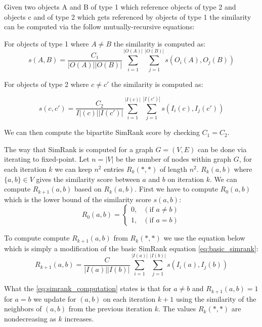 \begin{definition}\label{def:bipartite_simrank} Given two objects A and B of type 1 which reference objects of type 2 and objects c and of type 2 which gets referenced by objects of type 1 the similarity can be computed via the follow mutually-recursive equations:
	
	For objects of type 1 where $A \neq B$ the similarity is computed as:
	\begin{equation}\label{eq:bipartite_simrank1}
	s(A,B)= \frac{C_1}{|O(A)||O(B)|}\sum^{|O(A)|}_{i=1}\sum^{|O(B)|}_{j=1}s(O_i(A),O_j(B))
	\end{equation}
	
	For objects of type 2 where $c \neq c'$ the similarity is computed as:

	\begin{equation}\label{eq:bipartite_simrank2}
	s(c,c')= \frac{C_2}{I|(c)||I(c')|}\sum^{|I(c)|}_{i=1}\sum^{|I(c')|}_{j=1}s(I_i(c),I_j(c'))
	\end{equation}
	
	We can then compute the bipartite SimRank score by checking $C_1 = C_2$\cite{10.1145/775047.775126}.
\end{definition}

The way that SimRank is computed for a graph $G = (V,E)$ can be done via iterating to fixed-point. Let $n = |V|$ be the number of nodes within graph $G$, for each iteration $k$ we can keep $n^2$ entries $R_k(*,*)$ of length $n^2$. $R_k(a,b)$ where $\{a,b\} \in V$ gives the similarity score between $a$ and $b$ on iteration $k$\cite{10.1145/775047.775126}. We can compute $R_{k+1}(a,b)$ based on $R_k(a,b)$. First we have to compute $R_0(a,b)$ which is the lower bound of the similarity score $s(a,b)$:
\begin{equation}\label{eq:lowerbound_sim_score}
R_0(a,b)= \begin{cases}
0, & (\text{if } a \neq b) \\

1 ,& (\text{if } a = b)
\end{cases}
\end{equation}

To compute compute $R_{k+1}(a,b)$ from $R_k(*,*)$ we use the equation below which is simply a modification of the basic SimRank equation \ref{eq:basic_simrank}:
\begin{equation}\label{eq:simrank_computation}
R_{k+1}(a,b)= \frac{C}{|I(a)||I(b)|}\sum^{|I(a)|}_{i=1}\sum^{|I(b)|}_{j=1}s(I_i(a),I_j(b))
\end{equation}

What the \ref{eq:simrank_computation} states is that for $a \neq b$ and $R_{k+1}(a,b) = 1$ for $a = b$ we update for $(a,b)$ on each iteration $k+1$ using the similarity of the neighbors of $(a,b)$ from the previous iteration $k$. The values $R_k(*,*)$ are nondecreasing as $k$ increases. 
